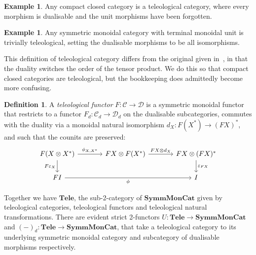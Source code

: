 \documentclass[11pt,letterpaper]{article}
\theoremstyle{plain}
\theoremstyle{definition}
\newtheorem{definition}[theorem]{Definition}
\newtheorem{example}[theorem]{Example}
\newcommand{\C}{\mathscr{C}}
\newcommand{\D}{\mathscr{D}}
\newcommand{\SymmMonCat}{\mathbf{SymmMonCat}}
\newcommand{\Tele}{\mathbf{Tele}}
\newcommand{\todo}[1]{\textcolor{red}{\small #1}}
\begin{document}
\begin{example}
  Any compact closed category is a teleological category, where every morphism is dualisable and the unit morphisms have been forgotten.
\end{example}
\begin{example}
  Any symmetric monoidal category with terminal monoidal unit is trivially teleological, setting the dualisable morphisms to be all isomorphisms.
\end{example}

This definition of teleological category differs from the original given in~\cite{CoherenceForLenses}, in that the duality switches the order of the tensor product. We do this so that compact closed categories are teleological, but the bookkeeping does admittedly become more confusing.



\begin{definition}
  A \emph{teleological functor} $F : \C \to \D$ is a symmetric monoidal functor that restricts to a functor $F_d : \C_d \to \D_d$ on the dualisable subcategories, commutes with the duality via a monoidal natural isomorphism $d_X : F(X^*) \to {(FX)}^*$, and such that the counits are preserved:
  \[
   \begin{tikzcd}[column sep = large]
    F(X \otimes X^*) \ar[r, "\phi_{X, X^*}"]  \ar[d, "F\varepsilon_X", swap] & FX \otimes F(X^*) \ar[r, "FX \otimes d_X"] & FX \otimes (FX)^* \ar[d, "\varepsilon_{FX}"] \\
    FI \ar[rr, "\phi", swap] & & I
  \end{tikzcd}
  \]

\end{definition}

Together we have $\Tele$, the sub-2-category of $\SymmMonCat$ given by teleological categories, teleological functors and teleological natural transformations. There are evident strict 2-functors $U : \Tele \to \SymmMonCat$ and ${(-)}_d : \Tele \to \SymmMonCat$, that take a teleological category to its underlying symmetric monoidal category and subcategory of dualisable morphisms respectively.
\end{document}
